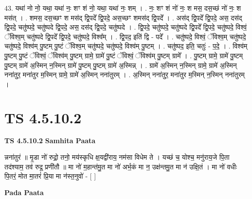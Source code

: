 \documentclass[17pt]{extarticle}
\begin{document}
43. यथा॑ नो नो॒ यथा॒ यथा॑ नः॒ शꣳ शं नो॒ यथा॒ यथा॑ नः॒ शम् । . नः॒ शꣳ शं नो॑ नः॒ श मस॒ दस॒च्छं नो॑ नः॒ श मस॑त् । . शमस॒ दस॒च्छꣳ श मस॑द् द्वि॒पदे᳚ द्वि॒पदे॒ अस॒च्छꣳ शमस॑द् द्वि॒पदे᳚ । . अस॑द् द्वि॒पदे᳚ द्वि॒पदे॒ अस॒ दस॑द् द्वि॒पदे॒ चतु॑ष्पदे॒ चतु॑ष्पदे द्वि॒पदे॒ अस॒ दस॑द् द्वि॒पदे॒ चतु॑ष्पदे । . द्वि॒पदे॒ चतु॑ष्पदे॒ चतु॑ष्पदे द्वि॒पदे᳚ द्वि॒पदे॒ चतु॑ष्पदे॒ विश्वं॒ ॅविश्व॒म् चतु॑ष्पदे द्वि॒पदे᳚ द्वि॒पदे॒ चतु॑ष्पदे॒ विश्व᳚म् । . द्वि॒पद॒ इति॑ द्वि - पदे᳚ । . चतु॑ष्पदे॒ विश्वं॒ ॅविश्व॒म् चतु॑ष्पदे॒ चतु॑ष्पदे॒ विश्व॑म् पु॒ष्टम् पु॒ष्टं ॅविश्व॒म् चतु॑ष्पदे॒ चतु॑ष्पदे॒ विश्व॑म् पु॒ष्टम् । . चतु॑ष्पद॒ इति॒ चतुः॑ - प॒दे॒ । . विश्व॑म् पु॒ष्टम् पु॒ष्टं ॅविश्वं॒ ॅविश्व॑म् पु॒ष्टम् ग्रामे॒ ग्रामे॑ पु॒ष्टं ॅविश्वं॒ ॅविश्व॑म् पु॒ष्टम् ग्रामे᳚ । . पु॒ष्टम् ग्रामे॒ ग्रामे॑ पु॒ष्टम् पु॒ष्टम् ग्रामे॑ अ॒स्मिन् न॒स्मिन् ग्रामे॑ पु॒ष्टम् पु॒ष्टम् ग्रामे॑ अ॒स्मिन्न् । . ग्रामे॑ अ॒स्मिन् न॒स्मिन् ग्रामे॒ ग्रामे॑ अ॒स्मिन् नना॑तुर॒ मना॑तुर म॒स्मिन् ग्रामे॒ ग्रामे॑ अ॒स्मिन् नना॑तुरम् । . अ॒स्मिन् नना॑तुर॒ मना॑तुर म॒स्मिन् न॒स्मिन् नना॑तुरम् । \newline
\pagebreak
{}

\section{ TS 4.5.10.2 }

\textbf{TS 4.5.10.2 } \newline
\textbf{Samhita Paata} \newline

न्नना॑तुरं ॥ मृ॒डा नो॑ रुद्रो॒ तनो॒ मय॑स्कृधि क्ष॒यद्वी॑राय॒ नम॑सा विधेम ते । यच्छं च॒ योश्च॒ मनु॑राय॒जे पि॒ता तद॑श्याम॒ तव॑ रुद्र॒ प्रणी॑तौ ॥ मा नो॑ म॒हान्त॑मु॒त मा नो॑ अर्भ॒कं मा न॒ उक्ष॑न्तमु॒त मा न॑ उक्षि॒तं । मा नो॑ वधीः पि॒तरं॒ मोत मा॒तरं॑ प्रि॒या मा न॑स्त॒नुवो॑ - [  ] \newline

\textbf{Pada Paata} \newline
\end{document}
